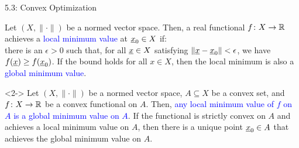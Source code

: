 \documentclass[10pt,letterpaper,english]{beamer}
\begin{document}
\begin{frame}{5.3: Convex Optimization}

\begin{definition}
Let $(X,\|\cdot\|)$ be a normed vector space.
Then, a real functional $f \colon X \rightarrow \mathbb{R}$ achieves a \textcolor{blue}{local minimum value} at $\underline{x}_0 \in X$ if: \\ \hspace{3mm}  there is an $\epsilon > 0$ such that, for all $\underline{x}\in X$ satisfying $\| \underline{x} - \underline{x}_0 \| < \epsilon$, we have  $f(\underline{x}) \geq f(\underline{x}_0)$.
If the bound holds for all $x\in X$, then the local minimum is also a \textcolor{blue}{global minimum value}.
\end{definition}

\vspace{2mm}

\begin{theorem}<2->
Let $(X,\|\cdot\|)$ be a normed vector space, $A \subseteq X$ be a convex set, and $f \colon X \rightarrow \mathbb{R}$ be a convex functional on $A$.
Then, \textcolor{blue}{any local minimum value of $f$ on $A$ is a global minimum value on $A$}.
If the functional is strictly convex on $A$ and achieves a local minimum value on $A$, then there is a unique point $\underline{x}_0 \in A$ that achieves the global minimum value on $A$.
\end{theorem}

\vspace{1mm}


\end{frame}
\end{document}
